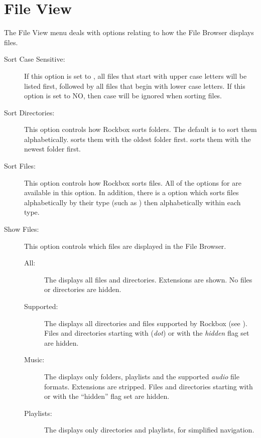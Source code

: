 \section{File View}
The File View menu deals with options relating to how the File Browser 
displays files.
%
\begin{description}
\item[Sort Case Sensitive:]
  If this option is set to , all files that start with upper case 
  letters will be listed first, followed by all files that begin with lower 
  case letters.  If this option is set to NO, then case will be ignored when 
  sorting files.
\item[Sort Directories:]
  This option controls how Rockbox sorts folders.  The default is to sort 
  them alphabetically.  sorts them with the oldest folder first. 
   sorts them with the newest folder first.
  
\item[Sort Files:]
  This option controls how Rockbox sorts files.  All of the options for 
   are available in this option.  In addition, there 
  is a  option which sorts files alphabetically by their type 
  (such as ) then alphabetically within each type.
  
\item[\label{ref:ShowFiles}Show Files:]
  This option controls which files are displayed in the File Browser.
  \begin{description}
  \item[All:] The  displays all files and directories.
    Extensions are shown. No files or directories are hidden.
  \item[Supported:] The  displays all directories and
    files supported by Rockbox (see ).
    Files and directories starting with  (\emph{dot}) or with the 
    \emph{hidden} flag set are hidden.
  \item[Music:] The  displays only folders, playlists and
    the supported \emph{audio} file formats. Extensions are stripped. Files and
    directories starting with  or with the ``hidden'' flag set are
    hidden.
  \item[Playlists:] The  displays only directories and playlists,
    for simplified navigation.
  \end{description}


\end{description}
